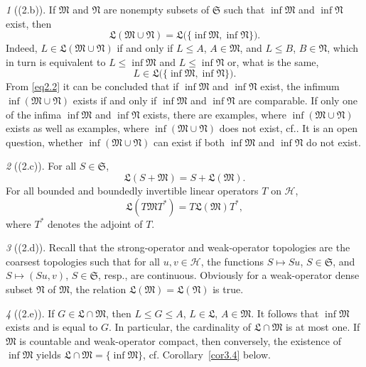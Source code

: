 \documentclass[12pt, a4paper, reqno, twoside]{amsart}
\numberwithin{equation}{section}
\newcommand{\frakS}{\mathfrak S}
\newcommand{\frakL}{\mathfrak L}
\newcommand{\frakM}{\mathfrak M}
\newcommand{\frakN}{\mathfrak N}
\newcommand{\cf}{\mbox{cf.}\xspace}
\theoremstyle{definition}
\theoremstyle{remark}
\theoremstyle{mystyle}
\newtheorem*{fact*}{}
\begin{document}
\begin{fact*}[(2.b)]
\label{fa2.b} 
If $\frakM$ and $\frakN$ are nonempty subsets of $\frakS$ such that
$\inf\frakM$ and $\inf\frakN$ exist, then
\begin{equation}
\label{eq2.2}
\frakL(\frakM\cup\frakN) =\frakL\bigl(\{\inf\frakM,\inf\frakN\}\bigr).
\end{equation}
Indeed, $L\in\frakL(\frakM\cup\frakN)$ if and only if $L\leq A$,
$A\in\frakM$, and $L\leq B$, $B\in\frakN$,
which
in turn is equivalent
to $L\leq\inf\frakM$ and $L\leq\inf\frakN$ or, what is the same, 
\[
  L\in \frakL\bigl(\{\inf\frakM,\inf\frakN\}\bigr).
\]
From \eqref{eq2.2} it can be concluded that if $\inf\frakM$ and
$\inf\frakN$ exist, the infimum $\inf(\frakM\cup\frakN)$ exists if
and only if $\inf\frakM$ and $\inf\frakN$ are comparable. If only one
of the infima $\inf\frakM$ and $\inf\frakN$ exists, there are
examples, where $\inf(\frakM\cup\frakN)$ exists as well as examples,
where $\inf(\frakM\cup\frakN)$ does not exist, \cf {}. 
It is an open question, whether $\inf(\frakM\cup\frakN)$ can exist if
both $\inf\frakM$ and $\inf\frakN$ do not exist.
\end{fact*}

\begin{fact*}[(2.c)] 
\label{fa2.c}
For all $S\in\frakS$,
\begin{equation}
  \label{eq2.3}
  \frakL(S+\frakM)=S+\frakL(\frakM).
\end{equation}  
For all bounded and boundedly invertible linear operators $T$ on
$\mathscr H$, 
\begin{equation}
  \label{eq2.4}
  \frakL(T\frakM T^{\ast}) = T \frakL(\frakM) T^{\ast},
\end{equation}
where $T^{\ast}$ denotes the adjoint of $T$.
\end{fact*}

\begin{fact*}[(2.d)]
\label{fa2.d}  
Recall that the strong-operator and weak-operator topologies are the
coarsest topologies such that for all $u,v\in\mathscr H$, the
functions  $S\mapsto Su$, $S\in\frakS$, and $S\mapsto (Su,v)$,
$S\in\frakS$, resp., are continuous. Obviously for a weak-operator
dense subset $\frakN$ of $\frakM$, the relation
$\frakL(\frakM)=\frakL(\frakN)$ is true.
\end{fact*}

\begin{fact*}[(2.e)]
\label{fa2.e}  
If $G\in\frakL\cap\frakM$, then $L\leq G\leq A$, $L\in\frakL$,
$A\in\frakM$. It follows that $\inf\frakM$ exists and is equal to
$G$. In particular, the cardinality of $\frakL\cap\frakM$ is at most
one. If $\frakM$ is countable and weak-operator compact, then
conversely, the existence of $\inf\frakM$ yields
$\frakL\cap\frakM=\{\inf\frakM\}$, \cf Corollary~\ref{cor3.4} below.
\end{fact*}
\end{document}
